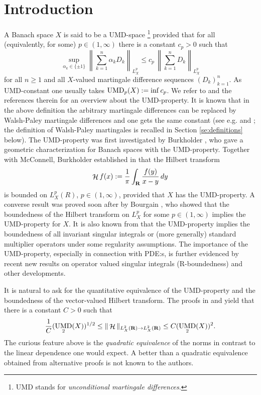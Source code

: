 \documentclass[11pt,a4paper,twoside,draft]{amsart}
\theoremstyle{definition}
\newcommand{\beqla}[1] {\begin {eqnarray}\label{#1}}
\def\eeq {\end {eqnarray}}
\newcommand{\real}{{\bf R}}
\DeclareMathOperator{\htt}{{\mathcal H}}
\DeclareMathOperator{\umd}{{\rm UMD}}
\begin{document}
\section{Introduction}\label{se:intro}
A Banach space $X$ is said to be a UMD-space  
\footnote{UMD stands for {\em unconditional martingale differences}.}
provided that for all (equivalently, for some)
$p\in (1,\infty)$ there is a constant  $c_p>0$ such that
\[   \sup_{\alpha_k\in \{\pm 1\}} 
              \left \| \sum_{k=1}^n \alpha_k  D_k \right \|_{L_X^p}
   \le c_p \, \left \| \sum_{k=1}^n           D_k \right \|_{L_X^p} \]
for all $n\geq 1$ and all $X$-valued martingale difference sequences
$(D_k)_{k=1}^n$. As UMD-constant one usually takes $\umd_p(X):=\inf c_p$. We refer to
\cite{Burk3} and the references therein for an overview 
 about the UMD-property.
It is known that in the above definition the arbitrary martingale differences
can be replaced by Walsh-Paley martingale differences and one gets the same 
constant (see e.g. \cite[p. 12]{Burk4}
and \cite{Maurey}; the definition of Walsh-Paley martingales is recalled in Section \ref{se:definitions} below). The UMD-property was first investigated by Burkholder \cite{Burk1},
who gave a geometric characterization for Banach spaces with the 
UMD-property.  
Together with McConnell, Burkholder established in \cite{Burk2} that the 
Hilbert transform 
\beqla{eq:1.1}
\htt f(x):={\frac{1}{\pi}}\int_\real {\frac{f(y)}{x-y}}\, dy
\eeq
is bounded on $L^p_X(R)$, $p\in (1,\infty)$, provided that $X$ has the UMD-property. 
A converse result was proved soon after by Bourgain \cite{Bou},
who showed that the boundedness of the Hilbert transform on $L^p_X$ for
some $p\in (1,\infty )$ implies the UMD-property for $X.$ It is
also known from \cite{Bou2} that the UMD-property implies the boundedness of 
all invariant singular integrals or (more generally)  standard  multiplier 
operators under some regularity assumptions. The importance of the 
UMD-property, especially 
in connection with  PDE:s, is further evidenced by recent new results
on operator valued singular integrals (R-boundedness) \cite{Weis} and other
developments.

It is natural to ask for the quantitative equivalence of the UMD-property and the 
boundedness of the vector-valued Hilbert transform. The proofs in \cite{Burk2} 
and \cite{Bou} yield that there is a constant $C>0$ such that 
\beqla{eq:1.10}
     {\frac{1}{C}}(\umd_2 (X))^{1/2}\leq \| \htt\|_{L^2_X(\real )\to L^2_X(\real )} 
\leq C(\umd_2 (X))^2.
\eeq
The curious feature above is the  {\it quadratic equivalence} of the norms  in 
contrast to the linear dependence one would expect. A better than a quadratic 
equivalence obtained from alternative proofs is not known to the authors.
\end{document}
